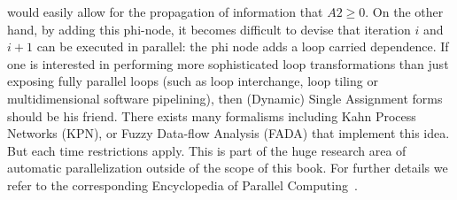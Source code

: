 would easily allow for the propagation of information that $A2\geq 0$. On the other hand, by adding this phi-node, it becomes difficult to devise that iteration $i$ and $i+1$ can be executed in parallel: the phi node adds a loop carried dependence. If one is interested in performing more sophisticated loop transformations than just exposing fully parallel loops (such as loop interchange, loop tiling or multidimensional software pipelining), then (Dynamic) Single Assignment forms should be his friend. There exists many formalisms including Kahn Process Networks (KPN), or Fuzzy Data-flow Analysis (FADA) that implement this idea. But each time restrictions apply. This is part of the huge research area of automatic parallelization outside of the scope of this book. For further details we refer to the corresponding Encyclopedia of Parallel Computing~\cite{Padua}.
